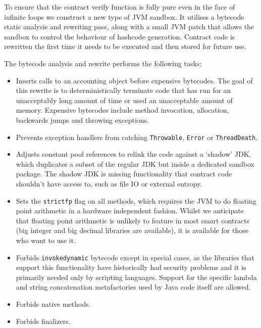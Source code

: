 \documentclass{article}
\begin{document}
To ensure that the contract verify function is fully pure even in the face of infinite loops we construct a new
type of JVM sandbox. It utilises a bytecode static analysis and rewriting pass, along with a small JVM patch that
allows the sandbox to control the behaviour of hashcode generation. Contract code is rewritten the first time
it needs to be executed and then stored for future use.

The bytecode analysis and rewrite performs the following tasks:

\begin{itemize}
\item Inserts calls to an accounting object before expensive bytecodes. The goal of this rewrite is to deterministically
terminate code that has run for an unacceptably long amount of time or used an unacceptable amount of memory. Expensive
bytecodes include method invocation, allocation, backwards jumps and throwing exceptions.
\item Prevents exception handlers from catching \texttt{Throwable}, \texttt{Error} or \texttt{ThreadDeath}.
\item Adjusts constant pool references to relink the code against a `shadow' JDK, which duplicates a subset of the regular
JDK but inside a dedicated sandbox package. The shadow JDK is missing functionality that contract code shouldn't have access
to, such as file IO or external entropy.
\item Sets the \texttt{strictfp} flag on all methods, which requires the JVM to do floating point arithmetic in a hardware
independent fashion. Whilst we anticipate that floating point arithmetic is unlikely to feature in most smart contracts
(big integer and big decimal libraries are available), it is available for those who want to use it.
\item Forbids \texttt{invokedynamic} bytecode except in special cases, as the libraries that support this functionality have
historically had security problems and it is primarily needed only by scripting languages. Support for the specific
lambda and string concatenation metafactories used by Java code itself are allowed.
\item Forbids native methods.
\item Forbids finalizers.
\end{itemize}
\end{document}
